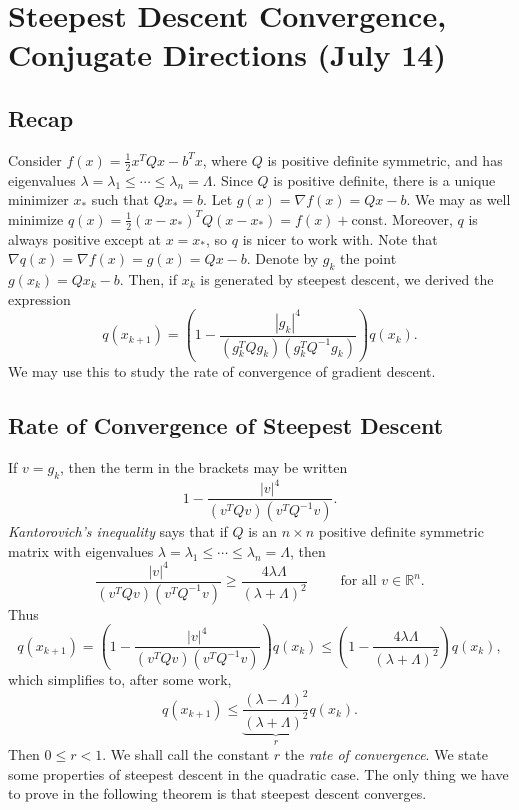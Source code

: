 \documentclass[11pt]{article}
\newcommand{\R}{\mathbb{R}}
\begin{document}
\newpage

\section{Steepest Descent Convergence, Conjugate Directions (July 14)}

\subsection{Recap}

Consider $f(x) = \frac{1}{2}x^TQx - b^Tx$, where $Q$ is positive definite symmetric, and has eigenvalues $\lambda = \lambda_1 \leq \cdots \leq \lambda_n = \Lambda$. Since $Q$ is positive definite, there is a unique minimizer $x_*$ such that $Qx_* = b$. Let $g(x) = \nabla f(x) = Qx - b$. We may as well minimize $q(x) = \frac{1}{2}(x-x_*)^TQ(x-x_*) = f(x) + \mathrm{const}$. Moreover, $q$ is always positive except at $x = x_*$, so $q$ is nicer to work with. Note that $\nabla q(x) = \nabla f(x) = g(x) = Qx - b$. Denote by $g_k$ the point $g(x_k) = Qx_k - b$. Then, if $x_k$ is generated by steepest descent, we derived the expression
\[
q(x_{k+1}) = \left( 1 - \frac{|g_k|^4}{(g_k^TQg_k)(g_k^TQ^{-1}g_k)} \right)q(x_k).
\]
We may use this to study the rate of convergence of gradient descent.

\subsection{Rate of Convergence of Steepest Descent} 

If $v = g_k$, then the term in the brackets may be written
\[
1 - \frac{|v|^4}{(v^TQv)(v^TQ^{-1}v)}.
\]
\emph{Kantorovich's inequality} says that if $Q$ is an $n \times n$ positive definite symmetric matrix with eigenvalues $\lambda = \lambda_1 \leq \cdots \leq \lambda_n = \Lambda$, then
\[
\frac{|v|^4}{(v^T Q v)(v^T Q^{-1} v)} \geq \frac{4\lambda\Lambda}{(\lambda+\Lambda)^2} \qquad \text{ for all } v \in \R^n.
\]
Thus
\[
q(x_{k+1}) = \left( 1 - \frac{|v|^4}{(v^TQv)(v^TQ^{-1}v)} \right)q(x_k) \leq \left( 1 - \frac{4\lambda\Lambda}{(\lambda+\Lambda)^2} \right) q(x_k),
\]
which simplifies to, after some work,
\[
q(x_{k+1}) \leq \underbrace{\frac{(\lambda - \Lambda)^2}{(\lambda + \Lambda)^2}}_{r} q(x_k).
\]
Then $0 \leq r < 1$. We shall call the constant $r$ the \emph{rate of convergence}. We state some properties of steepest descent in the quadratic case. The only thing we have to prove in the following theorem is that steepest descent converges.
\end{document}
